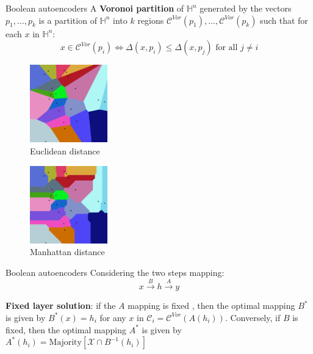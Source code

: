 \documentclass{beamer}
\begin{document}
\begin{frame}{Boolean autoencoders}
    A \textbf{Voronoi partition} of $\mathbb{H}^n$ generated by the vectors $p_1, \dots, p_k$ is a partition of $\mathbb{H}^n$ into $k$ regions $\mathcal{C}^{Vor}(p_1), \dots, \mathcal{C}^{Vor}(p_k)$ such that for each $x$ in $\mathbb{H}^n$:
\[
    x \in \mathcal{C}^{Vor}(p_i) \iff \Delta(x, p_i) \leq \Delta(x, p_j) \text{ for all } j \neq i    
\]
\begin{multicols}{2}
    \begin{center}
        \begin{figure}[H]
            \centering
            \includegraphics[width=0.3\textwidth]{./Images/Euclidean_Voronoi_diagram.png}
            \caption{Euclidean distance}
        \end{figure}
    \end{center}
    \begin{center}
        \begin{figure}[H]
            \centering
            \includegraphics[width=0.3\textwidth]{./Images/Manhattan_Voronoi_Diagram.png}
            \caption{Manhattan distance}
        \end{figure}
    \end{center}
\end{multicols}
\end{frame}


\begin{frame}{Boolean autoencoders}
Considering the two steps mapping:
\[
    x \xrightarrow{B} h \xrightarrow{A} y
\]
\hspace{0.5cm}
\begin{theorem}
    \textbf{Fixed layer solution}: if the $A$ mapping is fixed , then the optimal mapping $B^*$ is given by $B^*(x) = h_i$ for any $x$ in $\mathcal{C}_i = \mathcal{C}^{Vor}(A(h_i))$. Conversely, if $B$ is fixed, then the optimal mapping $A^*$ is given by $A^*(h_i) = \text{Majority}\left[\mathcal{X} \cap B^{-1}(h_i)\right]$ 
\end{theorem}
\end{frame}
\end{document}
